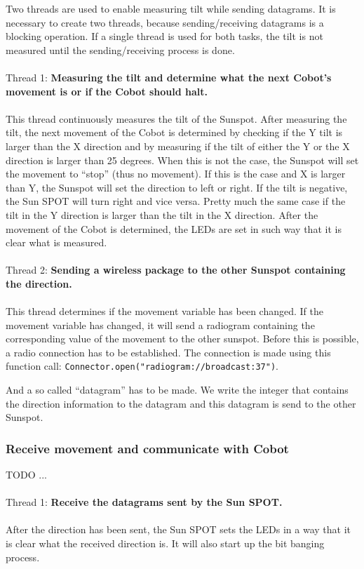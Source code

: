 \documentclass[a4paper,10pt]{article} %
\begin{document}
Two threads are used to enable measuring tilt while sending datagrams. It is
necessary to create two threads, because sending/receiving datagrams is a
blocking operation. If a single thread is used for both tasks, the tilt is not
measured until the sending/receiving process is done.
\\
\\
\noindent Thread 1: \textbf{Measuring the tilt and determine what the next Cobot's
movement is or if the Cobot should halt.}
\\
\\
This thread continuously measures the tilt of the Sunspot. After measuring the
tilt, the next movement of the Cobot is determined by checking if the Y tilt is
larger than the X direction and by measuring if the tilt of either the Y or the
X direction is larger than 25 degrees. When this is not the case, the Sunspot
will set the movement to ``stop'' (thus no movement). If this is the case and X
is larger than Y, the Sunspot will set the direction to left or right. If the
tilt is negative, the Sun SPOT will turn right and vice versa.  Pretty much the
same case if the tilt in the Y direction is larger than the tilt in the X
direction. After the movement of the Cobot is determined, the LEDs are set in
such way that it is clear what is measured.
\\
\\
\noindent Thread 2: \textbf{Sending a wireless package to the other Sunspot
containing the direction.}
\\
\\
This thread determines if the movement variable has been changed. If the
movement variable has changed, it will send a radiogram containing the
corresponding value of the movement to the other sunspot. Before this is
possible, a radio connection has to be established. The connection is made using
this function call: \texttt{Connector.open("radiogram://broadcast:37")}.

And a so called ``datagram'' has to be made. We write the integer that contains
the direction information to the datagram and this datagram is send to the other
Sunspot.


\subsubsection{Receive movement and communicate with Cobot} %
TODO ...
\\
\\
\noindent Thread 1: \textbf{Receive the datagrams sent by the Sun SPOT.}
\\
\\
After the direction has been sent, the Sun SPOT sets the LEDs in a way that
it is clear what the received direction is. It will also start up the bit
banging process.
\end{document}
